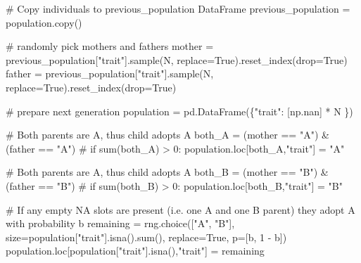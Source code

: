 \documentclass[
  a4paperpaper,
  ,captions=tableheading
]{scrbook}
\newenvironment{Shaded}{\begin{snugshade}}{\end{snugshade}}
\newcommand{\BuiltInTok}[1]{\textcolor[rgb]{0.00,0.23,0.31}{#1}}
\newcommand{\CommentTok}[1]{\textcolor[rgb]{0.37,0.37,0.37}{#1}}
\newcommand{\DecValTok}[1]{\textcolor[rgb]{0.68,0.00,0.00}{#1}}
\newcommand{\NormalTok}[1]{\textcolor[rgb]{0.00,0.23,0.31}{#1}}
\newcommand{\OperatorTok}[1]{\textcolor[rgb]{0.37,0.37,0.37}{#1}}
\newcommand{\StringTok}[1]{\textcolor[rgb]{0.13,0.47,0.30}{#1}}
\newcommand{\VariableTok}[1]{\textcolor[rgb]{0.07,0.07,0.07}{#1}}
\begin{document}
\begin{Shaded}
\begin{Highlighting}[]
            \CommentTok{\# Copy individuals to previous\_population DataFrame}
\NormalTok{            previous\_population }\OperatorTok{=}\NormalTok{ population.copy()}

            \CommentTok{\# randomly pick mothers and fathers}
\NormalTok{            mother }\OperatorTok{=}\NormalTok{ previous\_population[}\StringTok{"trait"}\NormalTok{].sample(N, replace}\OperatorTok{=}\VariableTok{True}\NormalTok{).reset\_index(drop}\OperatorTok{=}\VariableTok{True}\NormalTok{)}
\NormalTok{            father }\OperatorTok{=}\NormalTok{ previous\_population[}\StringTok{"trait"}\NormalTok{].sample(N, replace}\OperatorTok{=}\VariableTok{True}\NormalTok{).reset\_index(drop}\OperatorTok{=}\VariableTok{True}\NormalTok{)}

            \CommentTok{\# prepare next generation}
\NormalTok{            population }\OperatorTok{=}\NormalTok{ pd.DataFrame(\{}\StringTok{"trait"}\NormalTok{: [np.nan] }\OperatorTok{*}\NormalTok{ N \})}

            \CommentTok{\# Both parents are A, thus child adopts A}
\NormalTok{            both\_A }\OperatorTok{=}\NormalTok{ (mother }\OperatorTok{==} \StringTok{"A"}\NormalTok{) }\OperatorTok{\&}\NormalTok{ (father }\OperatorTok{==} \StringTok{"A"}\NormalTok{)}
            \CommentTok{\# if sum(both\_A) \textgreater{} 0:}
\NormalTok{            population.loc[both\_A,}\StringTok{"trait"}\NormalTok{] }\OperatorTok{=} \StringTok{"A"}

            \CommentTok{\# Both parents are A, thus child adopts A}
\NormalTok{            both\_B }\OperatorTok{=}\NormalTok{ (mother }\OperatorTok{==} \StringTok{"B"}\NormalTok{) }\OperatorTok{\&}\NormalTok{ (father }\OperatorTok{==} \StringTok{"B"}\NormalTok{)}
            \CommentTok{\# if sum(both\_B) \textgreater{} 0:}
\NormalTok{            population.loc[both\_B,}\StringTok{"trait"}\NormalTok{] }\OperatorTok{=} \StringTok{"B"}

            \CommentTok{\# If any empty NA slots are present (i.e. one A and one B parent) they adopt A with probability b}
\NormalTok{            remaining }\OperatorTok{=}\NormalTok{ rng.choice([}\StringTok{"A"}\NormalTok{, }\StringTok{"B"}\NormalTok{], size}\OperatorTok{=}\NormalTok{population[}\StringTok{"trait"}\NormalTok{].isna().}\BuiltInTok{sum}\NormalTok{(), replace}\OperatorTok{=}\VariableTok{True}\NormalTok{, p}\OperatorTok{=}\NormalTok{[b, }\DecValTok{1} \OperatorTok{{-}}\NormalTok{ b])}
\NormalTok{            population.loc[population[}\StringTok{"trait"}\NormalTok{].isna(),}\StringTok{"trait"}\NormalTok{] }\OperatorTok{=}\NormalTok{ remaining}
            

\end{Highlighting}
\end{Shaded}
\end{document}
